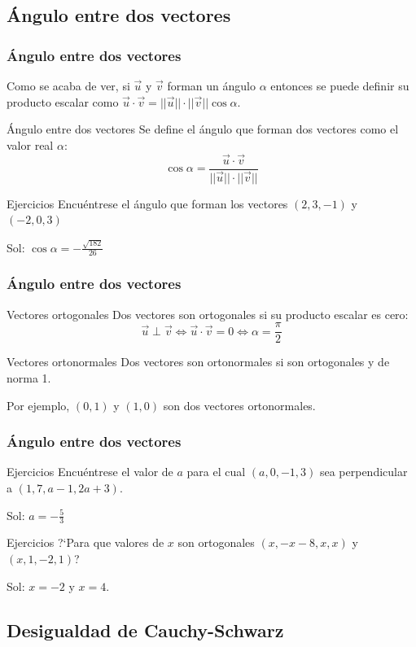 \documentclass{beamer}
\begin{document}
\subsection{\'Angulo entre dos vectores}

\begin{frame}
  \frametitle{\'Angulo entre dos vectores}
  Como se acaba de ver, si $\vec u$ y $\vec v$ forman un \'angulo $\alpha$ entonces se puede definir su producto escalar como $\vec u \cdot \vec v = ||\vec u||\cdot|| \vec v||\cos\alpha$.
    \begin{block}{\'Angulo entre dos vectores}
Se define el \'angulo que forman dos vectores como el valor real $\alpha$:
\[\cos\alpha = \frac{\vec u \cdot \vec v} {||\vec u||\cdot|| \vec v||}\]
 \end{block}
    \begin{block}{Ejercicios}
Encu\'entrese el \'angulo que forman los vectores $(2,3,-1)$ y $(-2,0,3)$
 \end{block}
Sol: $\cos \alpha = -\frac{\sqrt{182}}{26}$
\end{frame}


\begin{frame}
  \frametitle{\'Angulo entre dos vectores}
    \begin{block}{Vectores ortogonales}
Dos vectores son ortogonales si su producto escalar es cero:
\[\vec u \perp \vec v \Leftrightarrow \vec u \cdot \vec v = 0 \Leftrightarrow \alpha = \frac{\pi}{2}\]
 \end{block}
    \begin{block}{Vectores ortonormales}
Dos vectores son ortonormales si son ortogonales y de norma 1.
 \end{block}
Por ejemplo, $(0,1)$ y $(1,0)$ son dos vectores ortonormales. 
\end{frame}


\begin{frame}
  \frametitle{\'Angulo entre dos vectores}
    \begin{block}{Ejercicios}
Encu\'entrese el valor de $a$ para el cual $(a,0,-1,3)$ sea perpendicular a $(1,7,a-1,2a+3)$.
 \end{block}
 Sol: $a=-\frac{5}{3}$
    \begin{block}{Ejercicios}
?`Para que valores de $x$ son ortogonales $(x,-x-8,x,x)$ y $(x,1,-2,1)$?
 \end{block}
Sol: $x=-2$ y $x=4$.
\end{frame}

\subsection{Desigualdad de Cauchy-Schwarz}
\end{document}
